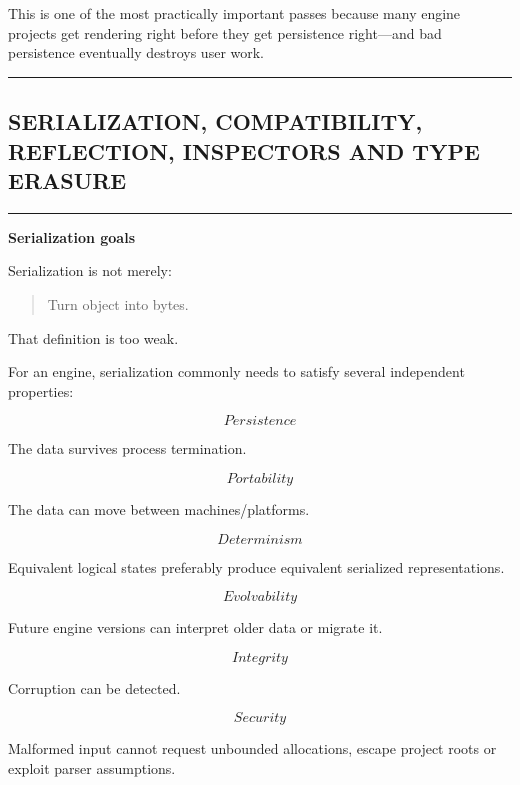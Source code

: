 This is one of the most practically important passes because many engine projects get rendering right before they get persistence right---and bad persistence eventually destroys user work.

\begin{center}\rule{0.5\linewidth}{0.5pt}\end{center}

\subsection{SERIALIZATION, COMPATIBILITY, REFLECTION, INSPECTORS AND TYPE ERASURE}\label{05-engine-i-ch011-serialization-compatibility-reflection-inspectors-and-type-erasure}

\hypertarget{05-engine-i-ch011-serialization-compatibility-reflection-inspectors-and-type-erasure}{}

\begin{center}\rule{0.5\linewidth}{0.5pt}\end{center}

\textbf{Serialization goals}

Serialization is not merely:

\begin{quote}
Turn object into bytes.
\end{quote}

That definition is too weak.

For an engine, serialization commonly needs to satisfy several independent properties:

\[
\boxed{
Persistence
}
\]

The data survives process termination.

\[
\boxed{
Portability
}
\]

The data can move between machines/platforms.

\[
\boxed{
Determinism
}
\]

Equivalent logical states preferably produce equivalent serialized representations.

\[
\boxed{
Evolvability
}
\]

Future engine versions can interpret older data or migrate it.

\[
\boxed{
Integrity
}
\]

Corruption can be detected.

\[
\boxed{
Security
}
\]

Malformed input cannot request unbounded allocations, escape project roots or exploit parser assumptions.


